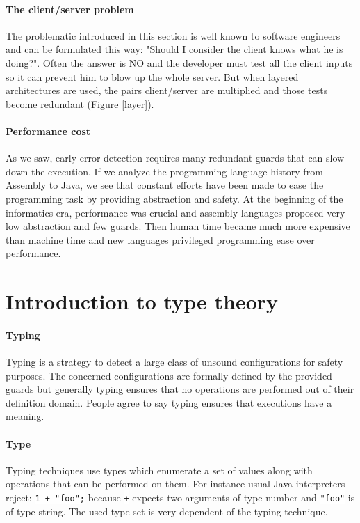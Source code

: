 \documentclass[a4paper]{report}
\newcommand{\ijava}[1]{\colorbox{white}{\lstinline[language=code]&#1&}} %
\newcommand{\reffig}[1]{(Figure \ref{#1})}
\begin{document}
\paragraph{The client/server problem} The problematic introduced in this section is well known to software engineers and can be formulated this way: "Should I consider the client knows what he is doing?". Often the answer is NO and the developer must test all the client inputs so it can prevent him to blow up the whole server. But when layered architectures are used, the pairs client/server are multiplied and those tests become redundant \reffig{layer}.

\paragraph{Performance cost} As we saw, early error detection requires many redundant guards that can slow down the execution. If we analyze the programming language history from Assembly to Java, we see that constant efforts have been made to ease the programming task by providing abstraction and safety. At the beginning of the informatics era, performance was crucial and assembly languages proposed very low abstraction and few guards. Then human time became much more expensive than machine time and new languages privileged programming ease over performance.

\section{Introduction to type theory}

\paragraph{Typing} Typing is a strategy to detect a large class of unsound configurations for safety purposes. The concerned configurations are formally defined by the provided guards but generally typing ensures that no operations are performed out of their definition domain. People agree to say typing ensures that executions have a meaning.

\paragraph{Type} Typing techniques use types which enumerate a set of values along with operations that can be performed on them. For instance usual Java interpreters reject: \ijava{1 + "foo";} because \ijava{+} expects two arguments of type number and \ijava{"foo"} is of type string. The used type set is very dependent of the typing technique.
\end{document}
